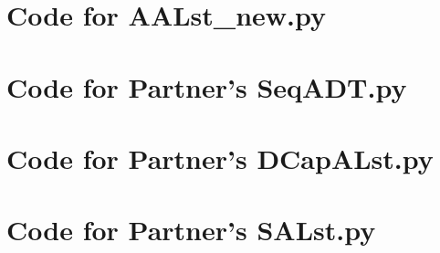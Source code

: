 \documentclass[12pt]{article}
\begin{document}
\newpage

\section{Code for AALst\_new.py}

\noindent 

\newpage

\section{Code for Partner's SeqADT.py}

\noindent 

\newpage

\section{Code for Partner's DCapALst.py}

\noindent 

\newpage

\section{Code for Partner's SALst.py}

\noindent 
\end{document}
